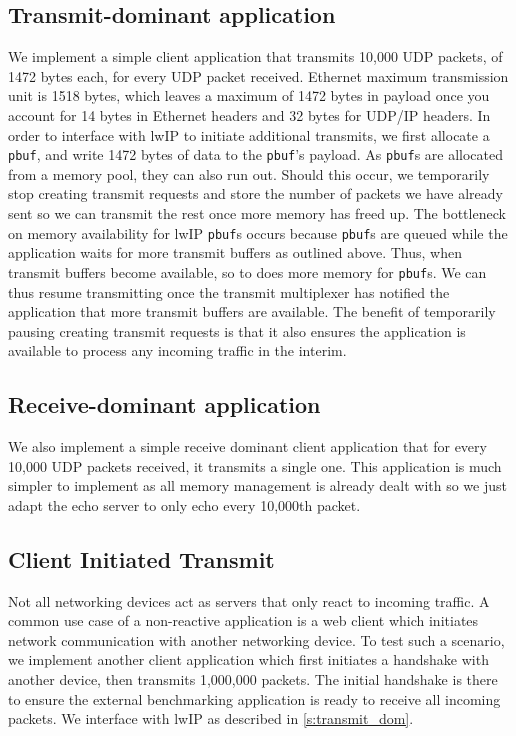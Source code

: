 \subsection{Transmit-dominant application}\label{s:transmit_dom}
We implement a simple client application that transmits 10,000 UDP packets, of 1472 bytes each, for every UDP packet received.
Ethernet maximum transmission unit is 1518 bytes, which leaves a maximum of 1472 bytes in payload once you account for 14 bytes
in Ethernet headers and 32 bytes for UDP/IP headers. 
In order to interface with lwIP to initiate additional transmits, we first allocate a \texttt{pbuf}, and write 1472 bytes of data
to the \texttt{pbuf}'s payload. As \texttt{pbuf}s are allocated from a memory pool, they can also run out. Should this occur, we temporarily
stop creating transmit requests and store the number of packets we have already sent so we can transmit the rest once more 
memory has freed up. The bottleneck on memory availability for lwIP \texttt{pbuf}s occurs because \texttt{pbuf}s are queued while the application
waits for more transmit buffers as outlined above. Thus, when transmit buffers become available, so to does more memory for
\texttt{pbuf}s. We can thus resume transmitting once the transmit multiplexer has notified the application that more
transmit buffers are available. The benefit of temporarily pausing creating transmit requests is that it also ensures the application
is available to process any incoming traffic in the interim. 

\subsection{Receive-dominant application}
We also implement a simple receive dominant client application that for every 10,000 UDP packets received, it transmits a single one.
This application is much simpler to implement as all memory management is already dealt with so we just adapt the echo server to 
only echo every 10,000th packet.\\

\subsection{Client Initiated Transmit}
Not all networking devices act as servers that only react to incoming traffic. A common use case of a non-reactive application is a 
web client which initiates network communication with another networking device. To test such a scenario, we implement another client
application which first initiates a handshake with another device, then transmits 1,000,000 packets. The initial handshake is there to 
ensure the external benchmarking application is ready to receive all incoming packets. We interface with lwIP as described
in \autoref{s:transmit_dom}.

